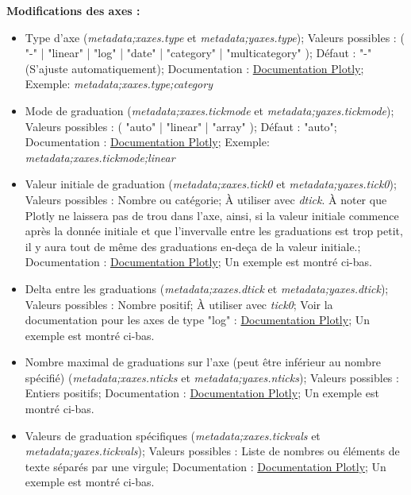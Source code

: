 \documentclass[11pt]{article}
\begin{document}
\textbf{Modifications des axes :}
\begin{itemize}
    \item Type d'axe (\textit{metadata;xaxes.type} et \textit{metadata;yaxes.type}); Valeurs possibles : ( "-" | "linear" | "log" | "date" | "category" | "multicategory" ); Défaut : "-" (S'ajuste automatiquement); Documentation : \href{https://plotly.com/python/reference/layout/xaxis/#layout-xaxis-type}{Documentation Plotly}; Exemple: \textit{metadata;xaxes.type;category}
    \item Mode de graduation (\textit{metadata;xaxes.tickmode} et \textit{metadata;yaxes.tickmode}); Valeurs possibles : ( "auto" | "linear" | "array" ); Défaut : "auto"; Documentation : \href{https://plotly.com/python/reference/layout/xaxis/#layout-xaxis-minor-tickmode}{Documentation Plotly}; Exemple: \textit{metadata;xaxes.tickmode;linear}
    \item Valeur initiale de graduation (\textit{metadata;xaxes.tick0} et \textit{metadata;yaxes.tick0}); Valeurs possibles : Nombre ou catégorie; À utiliser avec \textit{dtick}. À noter que Plotly ne laissera pas de trou dans l'axe, ainsi, si la valeur initiale commence après la donnée initiale et que l'invervalle entre les graduations est trop petit, il y aura tout de même des graduations en-deça de la valeur initiale.; Documentation : \href{https://plotly.com/python/reference/layout/xaxis/#layout-xaxis-tick0}{Documentation Plotly}; Un exemple est montré ci-bas.
    \item Delta entre les graduations (\textit{metadata;xaxes.dtick} et \textit{metadata;yaxes.dtick}); Valeurs possibles : Nombre positif; À utiliser avec \textit{tick0}; Voir la documentation pour les axes de type "log" : \href{https://plotly.com/python/reference/layout/xaxis/#layout-xaxis-dtick}{Documentation Plotly}; Un exemple est montré ci-bas.
    \item Nombre maximal de graduations sur l'axe (peut être inférieur au nombre spécifié) (\textit{metadata;xaxes.nticks} et \textit{metadata;yaxes.nticks}); Valeurs possibles : Entiers positifs; Documentation : \href{https://plotly.com/python/reference/layout/xaxis/#layout-xaxis-minor-nticks}{Documentation Plotly}; Un exemple est montré ci-bas.
    \item Valeurs de graduation spécifiques (\textit{metadata;xaxes.tickvals} et \textit{metadata;yaxes.tickvals}); Valeurs possibles : Liste de nombres ou éléments de texte séparés par une virgule; Documentation : \href{https://plotly.com/python/reference/layout/xaxis/#layout-xaxis-minor-tickvals}{Documentation Plotly}; Un exemple est montré ci-bas.

\end{itemize}
\end{document}
